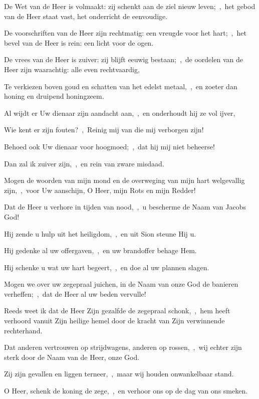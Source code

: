 \documentclass[12pt,twoside,a5paper]{article}
\begin{document}
\begin{halfparskip}
  De Wet van de Heer is volmaakt: zij schenkt aan de ziel nieuw leven;~\sep\ het gebod van de Heer staat vast, het onderricht de eenvoudige.

  De voorschriften van de Heer zijn rechtmatig: een vreugde voor het hart;~\sep\ het bevel van de Heer is rein: een licht voor de ogen.

  De vrees van de Heer is zuiver: zij blijft eeuwig bestaan;~\sep\ de oordelen van de Heer zijn waarachtig: alle even rechtvaardig,

  Te verkiezen boven goud en schatten van het edelst metaal,~\sep\ en zoeter dan honing en druipend honingzeem.

  Al wijdt er Uw dienaar zijn aandacht aan,~\sep\ en onderhoudt hij ze vol ijver,

  Wie kent er zijn fouten?~\sep\ Reinig mij van die mij verborgen zijn!

  Behoed ook Uw dienaar voor hoogmoed;~\sep\ dat hij mij niet beheerse!

  Dan zal ik zuiver zijn,~\sep\ en rein van zware misdaad.

  Mogen de woorden van mijn mond en de overweging van mijn hart welgevallig zijn,~\sep\ voor Uw aanschijn, O Heer, mijn Rots en mijn Redder!
\end{halfparskip}



\begin{halfparskip}
  Dat de Heer u verhore in tijden van nood,~\sep\ u bescherme de Naam van Jacobs God!


  Hij zende u hulp uit het heiligdom,~\sep\ en uit Sion steune Hij u.

  Hij gedenke al uw offergaven,~\sep\ en uw brandoffer behage Hem.

  Hij schenke u wat uw hart begeert,~\sep\ en doe al uw plannen slagen.

  Mogen we over uw zegepraal juichen, in de Naam van onze God de banieren verheffen;~\sep\ dat de Heer al uw beden vervulle!
\end{halfparskip}


\begin{halfparskip}
  Reeds weet ik dat de Heer Zijn gezalfde de zegepraal schonk,~\sep\ hem heeft verhoord vanuit Zijn heilige hemel door de kracht van Zijn verwinnende rechterhand.

  Dat anderen vertrouwen op strijdwagens, anderen op rossen,~\sep\ wij echter zijn sterk door de Naam van de Heer, onze God.

  Zij zijn gevallen en liggen terneer,~\sep\ maar wij houden onwankelbaar stand.

  O Heer, schenk de koning de zege,~\sep\ en verhoor ons op de dag van ons smeken.
\end{halfparskip}
\end{document}
